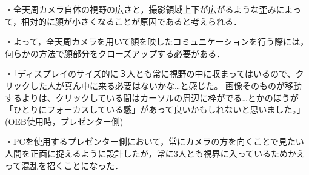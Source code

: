 ・全天周カメラ自体の視野の広さと，撮影領域上下が広がるような歪みによって，相対的に顔が小さくなることが原因であると考えられる．

・よって，全天周カメラを用いて顔を映したコミュニケーションを行う際には，何らかの方法で顔部分をクローズアップする必要がある．

・「ディスプレイのサイズ的に３人とも常に視野の中に収まってはいるので、クリックした人が真ん中に来る必要はないかな…と感じた。
画像そのものが移動するよりは、クリックしている間はカーソルの周辺に枠がでる…とかのほうが「ひとりにフォーカスしている感」があって良いかもしれないと思いました。」(OEB使用時，プレゼンター側)

・PCを使用するプレゼンター側において，常にカメラの方を向くことで見たい人間を正面に捉えるように設計したが，常に3人とも視界に入っているためかえって混乱を招くことになった．
